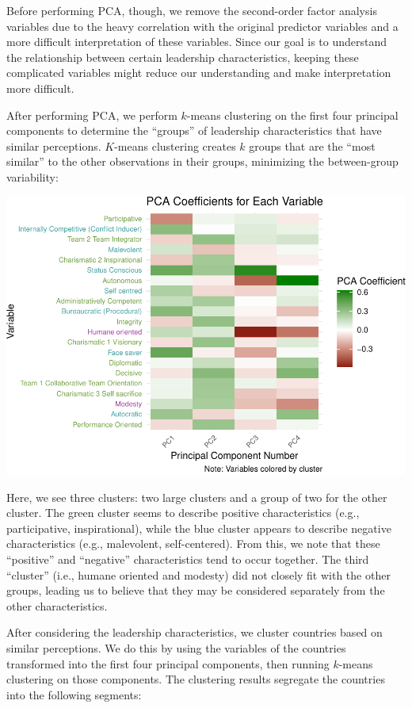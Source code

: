 \documentclass[
]{article}
\begin{document}
Before performing PCA, though, we remove the second-order factor
analysis variables due to the heavy correlation with the original
predictor variables and a more difficult interpretation of these
variables. Since our goal is to understand the relationship between
certain leadership characteristics, keeping these complicated variables
might reduce our understanding and make interpretation more difficult.

After performing PCA, we perform \(k\)-means clustering on the first
four principal components to determine the ``groups'' of leadership
characteristics that have similar perceptions. \(K\)-means clustering
creates \(k\) groups that are the ``most similar'' to the other
observations in their groups, minimizing the between-group variability:

\begin{center}\includegraphics[width=0.85\linewidth]{final_report_files/figure-latex/pca_heatmap-1} \end{center}

Here, we see three clusters: two large clusters and a group of two for
the other cluster. The green cluster seems to describe positive
characteristics (e.g., participative, inspirational), while the blue
cluster appears to describe negative characteristics (e.g., malevolent,
self-centered). From this, we note that these ``positive'' and
``negative'' characteristics tend to occur together. The third
``cluster'' (i.e., humane oriented and modesty) did not closely fit with
the other groups, leading us to believe that they may be considered
separately from the other characteristics.

After considering the leadership characteristics, we cluster countries
based on similar perceptions. We do this by using the variables of the
countries transformed into the first four principal components, then
running \(k\)-means clustering on those components. The clustering
results segregate the countries into the following segments:
\end{document}
